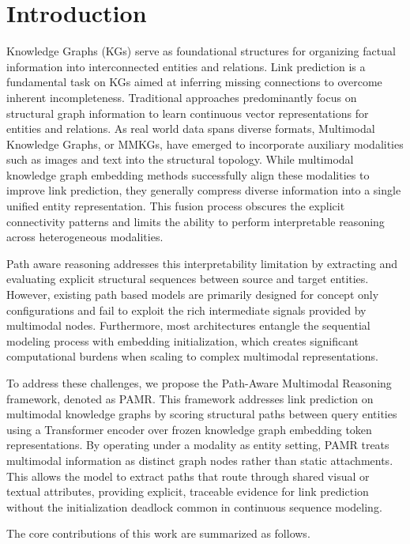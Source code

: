 \documentclass[runningheads]{llncs}
\begin{document}
\section{Introduction}
\label{sec:introduction}

Knowledge Graphs (KGs) serve as foundational structures for organizing factual information into interconnected entities and relations. Link prediction is a fundamental task on KGs aimed at inferring missing connections to overcome inherent incompleteness. Traditional approaches predominantly focus on structural graph information to learn continuous vector representations for entities and relations. As real world data spans diverse formats, Multimodal Knowledge Graphs, or MMKGs, have emerged to incorporate auxiliary modalities such as images and text into the structural topology. While multimodal knowledge graph embedding methods successfully align these modalities to improve link prediction, they generally compress diverse information into a single unified entity representation. This fusion process obscures the explicit connectivity patterns and limits the ability to perform interpretable reasoning across heterogeneous modalities.

Path aware reasoning addresses this interpretability limitation by extracting and evaluating explicit structural sequences between source and target entities. However, existing path based models are primarily designed for concept only configurations and fail to exploit the rich intermediate signals provided by multimodal nodes. Furthermore, most architectures entangle the sequential modeling process with embedding initialization, which creates significant computational burdens when scaling to complex multimodal representations.

To address these challenges, we propose the Path-Aware Multimodal Reasoning framework, denoted as PAMR. This framework addresses link prediction on multimodal knowledge graphs by scoring structural paths between query entities using a Transformer encoder over frozen knowledge graph embedding token representations. By operating under a modality as entity setting, PAMR treats multimodal information as distinct graph nodes rather than static attachments. This allows the model to extract paths that route through shared visual or textual attributes, providing explicit, traceable evidence for link prediction without the initialization deadlock common in continuous sequence modeling.

The core contributions of this work are summarized as follows.
\end{document}
